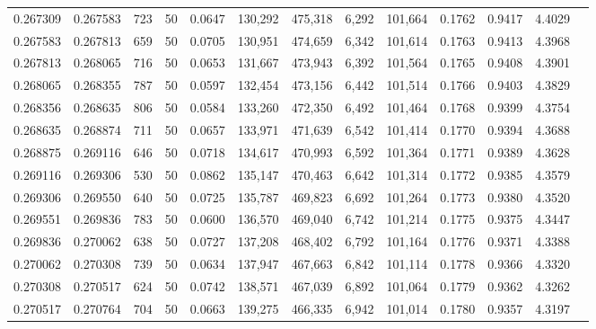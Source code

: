 \begin{tabular}{rrrrrrrrrrrrr}
0.267309 & 0.267583 &   723 &  50 &                                     0.0647 & 130,292 & 475,318 &   6,292 & 101,664 & 0.1762 & 0.9417 & 4.4029 \\
0.267583 & 0.267813 &   659 &  50 &                                     0.0705 & 130,951 & 474,659 &   6,342 & 101,614 & 0.1763 & 0.9413 & 4.3968 \\
0.267813 & 0.268065 &   716 &  50 &                                     0.0653 & 131,667 & 473,943 &   6,392 & 101,564 & 0.1765 & 0.9408 & 4.3901 \\
0.268065 & 0.268355 &   787 &  50 &                                     0.0597 & 132,454 & 473,156 &   6,442 & 101,514 & 0.1766 & 0.9403 & 4.3829 \\
0.268356 & 0.268635 &   806 &  50 &                                     0.0584 & 133,260 & 472,350 &   6,492 & 101,464 & 0.1768 & 0.9399 & 4.3754 \\
0.268635 & 0.268874 &   711 &  50 &                                     0.0657 & 133,971 & 471,639 &   6,542 & 101,414 & 0.1770 & 0.9394 & 4.3688 \\
0.268875 & 0.269116 &   646 &  50 &                                     0.0718 & 134,617 & 470,993 &   6,592 & 101,364 & 0.1771 & 0.9389 & 4.3628 \\
0.269116 & 0.269306 &   530 &  50 &                                     0.0862 & 135,147 & 470,463 &   6,642 & 101,314 & 0.1772 & 0.9385 & 4.3579 \\
0.269306 & 0.269550 &   640 &  50 &                                     0.0725 & 135,787 & 469,823 &   6,692 & 101,264 & 0.1773 & 0.9380 & 4.3520 \\
0.269551 & 0.269836 &   783 &  50 &                                     0.0600 & 136,570 & 469,040 &   6,742 & 101,214 & 0.1775 & 0.9375 & 4.3447 \\
0.269836 & 0.270062 &   638 &  50 &                                     0.0727 & 137,208 & 468,402 &   6,792 & 101,164 & 0.1776 & 0.9371 & 4.3388 \\
0.270062 & 0.270308 &   739 &  50 &                                     0.0634 & 137,947 & 467,663 &   6,842 & 101,114 & 0.1778 & 0.9366 & 4.3320 \\
0.270308 & 0.270517 &   624 &  50 &                                     0.0742 & 138,571 & 467,039 &   6,892 & 101,064 & 0.1779 & 0.9362 & 4.3262 \\
0.270517 & 0.270764 &   704 &  50 &                                     0.0663 & 139,275 & 466,335 &   6,942 & 101,014 & 0.1780 & 0.9357 & 4.3197 \\

\end{tabular}
